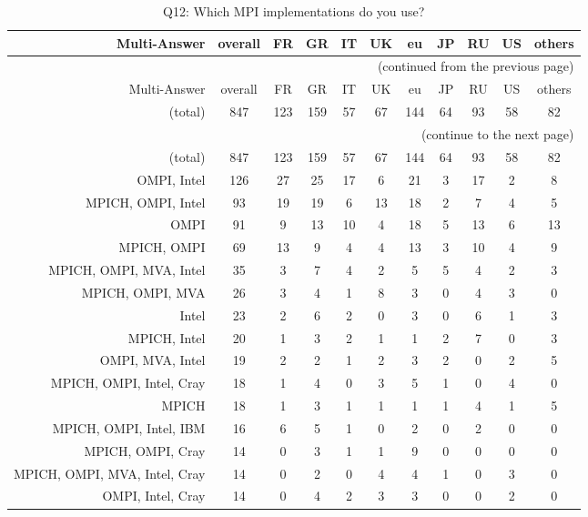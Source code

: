 \clearpage%
{\footnotesize\begin{landscape}%
\begin{longtable}[htb]{r|c|c|c|c|c|c|c|c|c|c}%
\caption{Q12: Which MPI implementations do you use?}%
\label{tab:Q12-mans} \\%
\hline%
Multi-Answer & overall & FR & GR & IT & UK & eu & JP & RU & US & others \\
 \hline%
\endfirsthead%
\multicolumn{11}{r}{(continued from the previous page)}\\%
\hline%
Multi-Answer & overall & FR & GR & IT & UK & eu & JP & RU & US & others \\
 \hline%
\endhead%
\hline%
(total) & 847 & 123 & 159 & 57 & 67 & 144 & 64 & 93 & 58 & 82 \\%
\hline%
\multicolumn{11}{r}{(continue to the next page)}\\%
\endfoot%
\hline%
(total) & 847 & 123 & 159 & 57 & 67 & 144 & 64 & 93 & 58 & 82 \\%
\hline%
\endlastfoot%
\hline%
{OMPI, Intel} & 126 & 27 & 25 & 17 & 6 & 21 & 3 & 17 & 2 & 8 \\%
{MPICH, OMPI, Intel} & 93 & 19 & 19 & 6 & 13 & 18 & 2 & 7 & 4 & 5 \\%
{OMPI} & 91 & 9 & 13 & 10 & 4 & 18 & 5 & 13 & 6 & 13 \\%
{MPICH, OMPI} & 69 & 13 & 9 & 4 & 4 & 13 & 3 & 10 & 4 & 9 \\%
{MPICH, OMPI, MVA, Intel} & 35 & 3 & 7 & 4 & 2 & 5 & 5 & 4 & 2 & 3 \\%
{MPICH, OMPI, MVA} & 26 & 3 & 4 & 1 & 8 & 3 & 0 & 4 & 3 & 0 \\%
{Intel} & 23 & 2 & 6 & 2 & 0 & 3 & 0 & 6 & 1 & 3 \\%
{MPICH, Intel} & 20 & 1 & 3 & 2 & 1 & 1 & 2 & 7 & 0 & 3 \\%
{OMPI, MVA, Intel} & 19 & 2 & 2 & 1 & 2 & 3 & 2 & 0 & 2 & 5 \\%
{MPICH, OMPI, Intel, Cray} & 18 & 1 & 4 & 0 & 3 & 5 & 1 & 0 & 4 & 0 \\%
{MPICH} & 18 & 1 & 3 & 1 & 1 & 1 & 1 & 4 & 1 & 5 \\%
{MPICH, OMPI, Intel, IBM} & 16 & 6 & 5 & 1 & 0 & 2 & 0 & 2 & 0 & 0 \\%
{MPICH, OMPI, Cray} & 14 & 0 & 3 & 1 & 1 & 9 & 0 & 0 & 0 & 0 \\%
{MPICH, OMPI, MVA, Intel, Cray} & 14 & 0 & 2 & 0 & 4 & 4 & 1 & 0 & 3 & 0 \\%
{OMPI, Intel, Cray} & 14 & 0 & 4 & 2 & 3 & 3 & 0 & 0 & 2 & 0 \\%

\end{longtable}
\end{landscape}}

